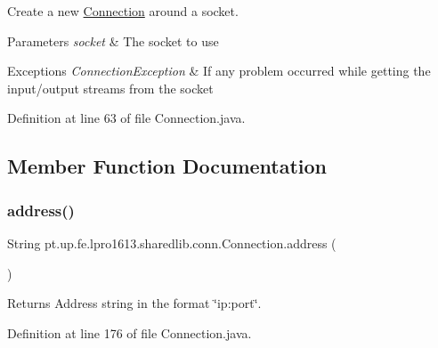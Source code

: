 Create a new \hyperlink{classpt_1_1up_1_1fe_1_1lpro1613_1_1sharedlib_1_1conn_1_1_connection}{Connection} around a socket.


\begin{DoxyParams}{Parameters}
{\em socket} & The socket to use \\
\hline
\end{DoxyParams}

\begin{DoxyExceptions}{Exceptions}
{\em Connection\+Exception} & If any problem occurred while getting the input/output streams from the socket \\
\hline
\end{DoxyExceptions}


Definition at line 63 of file Connection.\+java.



\subsection{Member Function Documentation}
\hypertarget{classpt_1_1up_1_1fe_1_1lpro1613_1_1sharedlib_1_1conn_1_1_connection_a58903a343693acbe946d4ad23eb29bd4}{}\label{classpt_1_1up_1_1fe_1_1lpro1613_1_1sharedlib_1_1conn_1_1_connection_a58903a343693acbe946d4ad23eb29bd4} 
\subsubsection{\texorpdfstring{address()}{address()}}
{\footnotesize\ttfamily String pt.\+up.\+fe.\+lpro1613.\+sharedlib.\+conn.\+Connection.\+address (\begin{DoxyParamCaption}{ }\end{DoxyParamCaption})}

\begin{DoxyReturn}{Returns}
Address string in the format \char`\"{}ip\+:port\char`\"{}. 
\end{DoxyReturn}


Definition at line 176 of file Connection.\+java.

